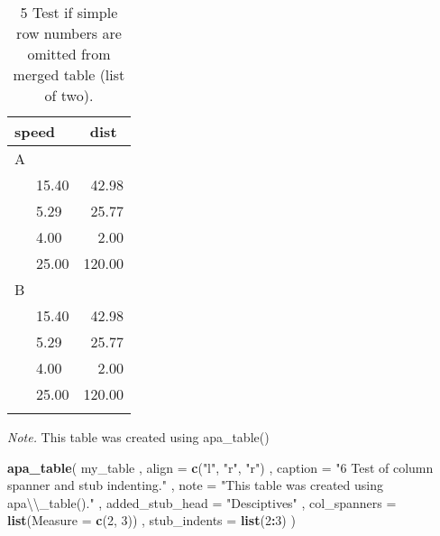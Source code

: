 \documentclass[english,man]{apa6}
\newenvironment{Shaded}{\begin{snugshade}}{\end{snugshade}}
\newcommand{\KeywordTok}[1]{\textcolor[rgb]{0.13,0.29,0.53}{\textbf{#1}}}
\newcommand{\DataTypeTok}[1]{\textcolor[rgb]{0.13,0.29,0.53}{#1}}
\newcommand{\DecValTok}[1]{\textcolor[rgb]{0.00,0.00,0.81}{#1}}
\newcommand{\CharTok}[1]{\textcolor[rgb]{0.31,0.60,0.02}{#1}}
\newcommand{\StringTok}[1]{\textcolor[rgb]{0.31,0.60,0.02}{#1}}
\newcommand{\OperatorTok}[1]{\textcolor[rgb]{0.81,0.36,0.00}{\textbf{#1}}}
\newcommand{\NormalTok}[1]{#1}
\theoremstyle{definition}
\theoremstyle{definition}
\theoremstyle{definition}
\theoremstyle{remark}
\begin{document}
\begin{table}[tbp]
\begin{center}
\begin{threeparttable}
\caption{\label{tab:unnamed-chunk-4}5 Test if simple row numbers are omitted from merged table (list of two).}
\begin{tabular}{lr}
\toprule
speed & \multicolumn{1}{c}{dist}\\
\midrule
A & \\
\ \ \ 15.40 & 42.98\\
\ \ \ 5.29 & 25.77\\
\ \ \ 4.00 & 2.00\\
\ \ \ 25.00 & 120.00\\
B & \\
\ \ \ 15.40 & 42.98\\
\ \ \ 5.29 & 25.77\\
\ \ \ 4.00 & 2.00\\
\ \ \ 25.00 & 120.00\\
\bottomrule
\addlinespace
\end{tabular}
\begin{tablenotes}[para]
\textit{Note.} This table was created using apa\_table()
\end{tablenotes}
\end{threeparttable}
\end{center}
\end{table}

\begin{Shaded}
\begin{Highlighting}[]
\KeywordTok{apa_table}\NormalTok{(}
\NormalTok{  my_table}
\NormalTok{  , }\DataTypeTok{align =} \KeywordTok{c}\NormalTok{(}\StringTok{"l"}\NormalTok{, }\StringTok{"r"}\NormalTok{, }\StringTok{"r"}\NormalTok{)}
\NormalTok{  , }\DataTypeTok{caption =} \StringTok{"6 Test of column spanner and stub indenting."}
\NormalTok{  , }\DataTypeTok{note =} \StringTok{"This table was created using apa}\CharTok{\textbackslash{}\textbackslash{}}\StringTok{_table()."}
\NormalTok{  , }\DataTypeTok{added_stub_head =} \StringTok{"Desciptives"}
\NormalTok{  , }\DataTypeTok{col_spanners =} \KeywordTok{list}\NormalTok{(}\DataTypeTok{Measure =} \KeywordTok{c}\NormalTok{(}\DecValTok{2}\NormalTok{, }\DecValTok{3}\NormalTok{))}
\NormalTok{  , }\DataTypeTok{stub_indents =} \KeywordTok{list}\NormalTok{(}\DecValTok{2}\OperatorTok{:}\DecValTok{3}\NormalTok{)}
\NormalTok{)}
\end{Highlighting}
\end{Shaded}
\end{document}
